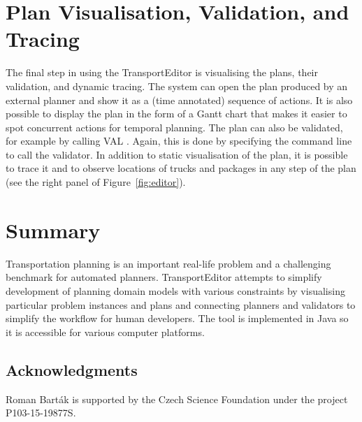 \documentclass[letterpaper]{article}
\begin{document}
\section{Plan Visualisation, Validation, and Tracing}
The final step in using the TransportEditor is visualising the plans, their validation, and dynamic tracing. The system can open the plan produced by an external planner and show it as a (time annotated) sequence of actions. It is also possible to display the plan in the form of a Gantt chart that makes it easier to spot concurrent actions for temporal planning. The plan can also be validated, for example by calling VAL \cite{val}. Again, this is done by specifying the command line to call the validator. In addition to static visualisation of the plan, it is possible to trace it and to observe locations of trucks and packages in any step of the plan (see the right panel of Figure~\ref{fig:editor}).


\section{Summary}
Transportation planning is an important real-life problem and a challenging benchmark for automated planners. TransportEditor attempts to simplify development of planning domain models with various constraints by visualising particular problem instances and plans and connecting planners and validators to simplify the workflow for human developers. The tool is implemented in Java so it is accessible for various computer platforms.


\subsection*{Acknowledgments}
Roman Bart\'{a}k is supported by the Czech Science Foundation under the project P103-15-19877S.
\end{document}
